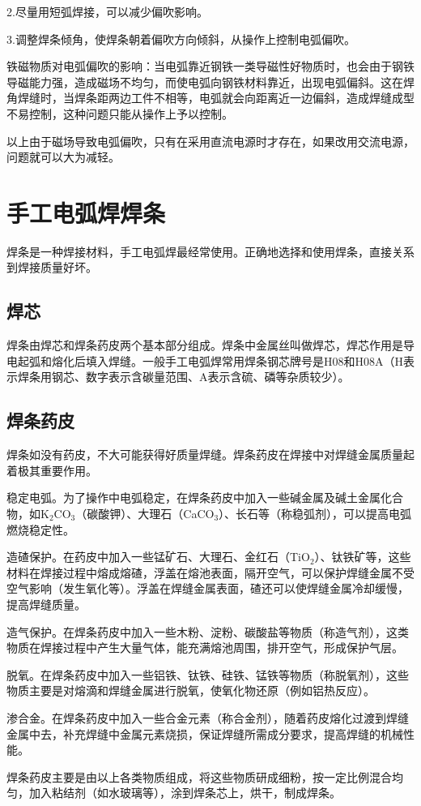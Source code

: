 \documentclass{ctexbook}
\begin{document}
2.尽量用短弧焊接，可以减少偏吹影响。

3.调整焊条倾角，使焊条朝着偏吹方向倾斜，从操作上控制电弧偏吹。

铁磁物质对电弧偏吹的影响：当电弧靠近钢铁一类导磁性好物质时，也会由于钢铁导磁能力强，造成磁场不均匀，而使电弧向钢铁材料靠近，出现电弧偏斜。这在焊角焊缝时，当焊条距两边工件不相等，电弧就会向距离近一边偏斜，造成焊缝成型不易控制，这种问题只能从操作上予以控制。

以上由于磁场导致电弧偏吹，只有在采用直流电源时才存在，如果改用交流电源，问题就可以大为减轻。
\section{手工电弧焊焊条}
焊条是一种焊接材料，手工电弧焊最经常使用。正确地选择和使用焊条，直接关系到焊接质量好坏。
\subsection{焊芯}
焊条由焊芯和焊条药皮两个基本部分组成。焊条中金属丝叫做焊芯，焊芯作用是导电起弧和熔化后填入焊缝。一般手工电弧焊常用焊条钢芯牌号是H08和H08A（H表示焊条用钢芯、数字表示含碳量范围、A表示含硫、磷等杂质较少）。
\subsection{焊条药皮}
焊条如没有药皮，不大可能获得好质量焊缝。焊条药皮在焊接中对焊缝金属质量起着极其重要作用。

稳定电弧。为了操作中电弧稳定，在焊条药皮中加入一些碱金属及碱土金属化合物，如K$_2$CO$_3$（碳酸钾）、大理石（CaCO$_3$）、长石等（称稳弧剂），可以提高电弧燃烧稳定性。

造碴保护。在药皮中加入一些锰矿石、大理石、金红石（TiO$_2$）、钛铁矿等，这些材料在焊接过程中熔成熔碴，浮盖在熔池表面，隔开空气，可以保护焊缝金属不受空气影响（发生氧化等）。浮盖在焊缝金属表面，碴还可以使焊缝金属冷却缓慢，提高焊缝质量。

造气保护。在焊条药皮中加入一些木粉、淀粉、碳酸盐等物质（称造气剂），这类物质在焊接过程中产生大量气体，能充满熔池周围，排开空气，形成保护气层。

脱氧。在焊条药皮中加入一些铝铁、钛铁、硅铁、锰铁等物质（称脱氧剂），这些物质主要是对熔滴和焊缝金属进行脱氧，使氧化物还原（例如铝热反应）。

渗合金。在焊条药皮中加入一些合金元素（称合金剂），随着药皮熔化过渡到焊缝金属中去，补充焊缝中金属元素烧损，保证焊缝所需成分要求，提高焊缝的机械性能。

焊条药皮主要是由以上各类物质组成，将这些物质研成细粉，按一定比例混合均匀，加入粘结剂（如水玻璃等），涂到焊条芯上，烘干，制成焊条。
\end{document}
